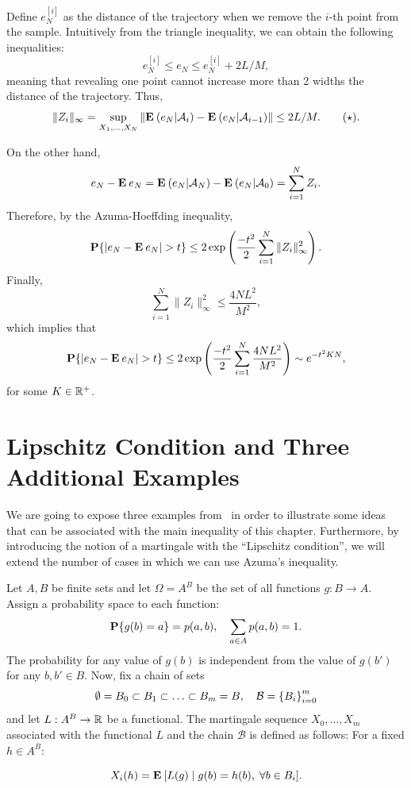 Define $e_N^{[i]}$ as the distance of the trajectory when we remove the $i$-th point from the sample. Intuitively from the triangle inequality, we can obtain the following inequalities:
\[ e_N^{[i]} \leq e_N \leq e_N^{[i]} + 2 L/M, \]
meaning that revealing one point cannot increase more than 2 widths the distance of the trajectory. Thus,
\[ \|Z_i\|_\infty = \sup_{X_1,\ldots, X_N} \|\E (e_N | \A_i) - \E (e_N | \A_{i-1})\| \leq 2L/M. \tag*{$ (\star)$}.\]

On the other hand,
\[  e_N - \E e_N = \E (e_N | \A_N) - \E (e_N | \A_{0}) = \sum_{i = 1}^{N} Z_i.\]
Therefore, by the Azuma-Hoeffding inequality,
\[ \P \{ |e_N - \E e_N| > t \} \leq 2\exp\left(\frac{-t^2}{2}\sum_{i = 1}^{N} \|Z_i\|_{\infty}^2 \right). \] 
Finally,
\[ \sum_{i = 1}^{N} \|Z_i\|_{\infty}^2 \leq \frac{4NL^2}{M^2}, \]
which implies that
\[\P \{ |e_N - \E e_N| > t \} \leq 2\exp\left(\frac{-t^2}{2}\sum_{i = 1}^{N} \frac{4NL^2}{M^2} \right) \sim e^{-t^{2} K N}, \] 
for some $K\in \R^+$.

\section{Lipschitz Condition and Three Additional Examples}

We are going to expose three examples from~\cite{alon2016probabilistic} in order to illustrate some ideas that can be associated with the main inequality of this chapter. Furthermore, by introducing the notion of a martingale with the ``Lipschitz condition'', we will extend the number of cases in which we can use Azuma's inequality.

\vspace*{1em}

Let $A,B$ be finite sets and let $\Omega = A^B$ be the set of all functions $g: B\to A$. Assign a probability space to each function:
\[ \P\{g(b) = a\} = p(a,b),\hspace*{1em} \sum_{a\in A} p(a,b) = 1. \]
The probability for any value of $g(b)$ is independent from the value of $g(b')$ for any $b,b' \in B$. Now, fix a chain of sets 
\[ \emptyset = B_0 \subset B_1 \subset \ldots \subset B_m = B,\hspace*{1em} \mathcal{B} = {\{B_i\}}_{i = 0}^m \]
and let $L: A^B \to \R$ be a functional. The martingale sequence $X_0,\ldots, X_m$ associated with the functional $L$ and the chain $\mathcal{B}$ is defined as follows: For a fixed $h \in A^B$:

\[ X_i(h) = \E[ L(g) \;|\; g(b) = h(b),\; \forall b\in B_i ]. \] 

